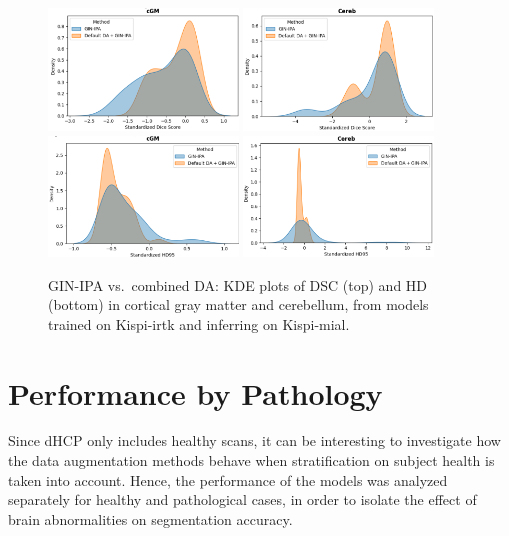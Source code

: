 \begin{figure}[htbp]
  \centering
  \includegraphics[width=0.45\textwidth]{figures/2_irtk-mial_DC_cGM.png}\quad
  \includegraphics[width=0.45\textwidth]{figures/2_irtk-mial_DC_Cereb.png} \\
  \vspace{10pt}
  \includegraphics[width=0.45\textwidth]{figures/2_irtk-mial_HD_cGM.png}\quad
  \includegraphics[width=0.45\textwidth]{figures/2_irtk-mial_HD_Cereb.png}
  \caption{GIN-IPA vs.\ combined DA: KDE plots of DSC (top) and HD (bottom) in cortical gray matter and cerebellum, from models trained on Kispi-irtk and inferring on Kispi-mial.}
  \label{fig:2_irtk_mial}
\end{figure}

\section{Performance by Pathology} \label{sec:PerformanceByPathology}
Since dHCP only includes healthy scans, it can be interesting to investigate how the data augmentation methods behave when stratification on subject health is taken into account. Hence, the performance of the models was analyzed separately for healthy and pathological cases, in order to isolate the effect of brain abnormalities on segmentation accuracy.

